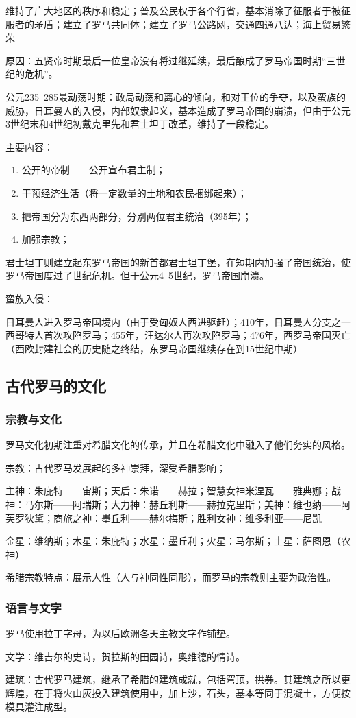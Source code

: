 维持了广大地区的秩序和稳定；普及公民权于各个行省，基本消除了征服者于被征服者的矛盾；建立了罗马共同体；建立了罗马公路网，交通四通八达；海上贸易繁荣 

原因：五贤帝时期最后一位皇帝没有将过继延续，最后酿成了罗马帝国时期“三世纪的危机”。

公元235~285最动荡时期：政局动荡和离心的倾向，和对王位的争夺，以及蛮族的威胁，日耳曼人的入侵，内部奴隶起义，基本造成了罗马帝国的崩溃，但由于公元3世纪末和4世纪初戴克里先和君士坦丁改革，维持了一段稳定。

主要内容：
\begin{enumerate}
    \item 公开的帝制——公开宣布君主制；
    \item 干预经济生活（将一定数量的土地和农民捆绑起来）；
    \item 把帝国分为东西两部分，分别两位君主统治（395年）；
    \item 加强宗教；
\end{enumerate}

君士坦丁则建立起东罗马帝国的新首都君士坦丁堡，在短期内加强了帝国统治，使罗马帝国度过了世纪危机。但于公元4~5世纪，罗马帝国崩溃。

蛮族入侵：

日耳曼人进入罗马帝国境内（由于受匈奴人西进驱赶）；410年，日耳曼人分支之一西哥特人首次攻陷罗马；455年，汪达尔人再次攻陷罗马；476年，西罗马帝国灭亡（西欧封建社会的历史随之终结，东罗马帝国继续存在到15世纪中期）

\subsection{古代罗马的文化}

\subsubsection{宗教与文化}

罗马文化初期注重对希腊文化的传承，并且在希腊文化中融入了他们务实的风格。

宗教：古代罗马发展起的多神崇拜，深受希腊影响；

主神：朱庇特——宙斯；天后：朱诺——赫拉；智慧女神米涅瓦——雅典娜；战神：马尔斯——阿瑞斯；大力神：赫丘利斯——赫拉克里斯；美神：维也纳——阿芙罗狄黛；商旅之神：墨丘利——赫尔梅斯；胜利女神：维多利亚——尼凯

金星：维纳斯；木星：朱庇特；水星：墨丘利；火星：马尔斯；土星：萨图恩（农神）

希腊宗教特点：展示人性（人与神同性同形），而罗马的宗教则主要为政治性。

\subsubsection{语言与文字}

罗马使用拉丁字母，为以后欧洲各天主教文字作铺垫。

文学：维吉尔的史诗，贺拉斯的田园诗，奥维德的情诗。

建筑：古代罗马建筑，继承了希腊的建筑成就，包括穹顶，拱券。其建筑之所以更辉煌，在于将火山灰投入建筑使用中，加上沙，石头，基本等同于混凝土，方便按模具灌注成型。